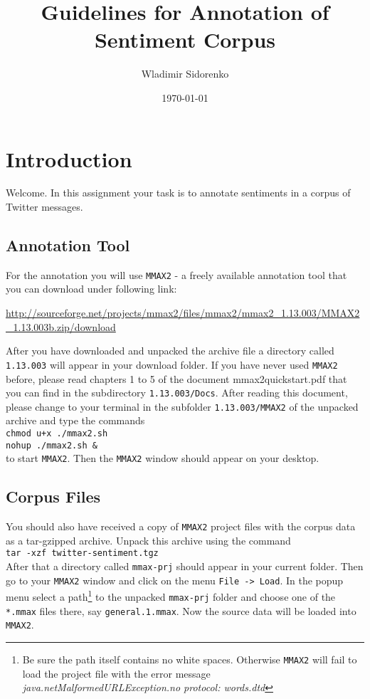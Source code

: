 \documentclass[11pt,a4paper]{article}
\author{Wladimir Sidorenko}
\date{\today}
\title{Guidelines for Annotation of Sentiment Corpus}
\begin{document}
\maketitle{}
\section{Introduction}
Welcome. In this assignment your task is to annotate sentiments in a
corpus of Twitter messages.

\subsection{Annotation Tool}

For the annotation you will use \texttt{MMAX2} - a freely available
annotation tool that you can download under following link:

\url{http://sourceforge.net/projects/mmax2/files/mmax2/mmax2_1.13.003/MMAX2_1.13.003b.zip/download}

After you have downloaded and unpacked the archive file a directory
called \texttt{1.13.003} will appear in your download folder. If you
have never used \texttt{MMAX2} before, please read chapters 1 to
5 of the document mmax2quickstart.pdf that you can find in the subdirectory
\texttt{1.13.003/Docs}. After reading this document, please
change to your terminal in the subfolder \texttt{1.13.003/MMAX2} of
the unpacked archive and type the commands\\ \texttt{chmod u+x
  ./mmax2.sh}\\ \texttt{nohup ./mmax2.sh \&}\\ to start
\texttt{MMAX2}. Then the \texttt{MMAX2} window should appear
on your desktop.

\subsection{Corpus Files}

You should also have received a copy of \texttt{MMAX2} project files
with the corpus data as a tar-gzipped archive. Unpack this archive using
the command\\\texttt{tar -xzf twitter-sentiment.tgz}\\After that a
directory called \texttt{mmax-prj} should appear in your current
folder. Then go to your \texttt{MMAX2} window and click on
the menu \texttt{File -> Load}. In the popup menu select a
path\footnote{Be sure the path itself contains no white spaces. Otherwise \texttt{MMAX2} will fail to load the project file with the error message \emph{java.netMalformedURLException.no protocol: words.dtd}} to the unpacked \texttt{mmax-prj} folder and choose one of the
\texttt{*.mmax} files there, say \texttt{general.1.mmax}. Now the source data will be loaded into \texttt{MMAX2}. 
\end{document}
